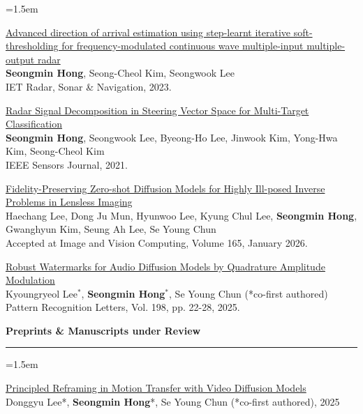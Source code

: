 \documentclass[a4paper,11pt]{article}
\newcommand{\sectitle}[1]{
    \vspace{2ex}
    {\Large\textbf{#1}}
    \vspace{0.5ex}
    \hrule
    \vspace{1.5ex}
}
\newenvironment{cvcontent}{
    \begin{list}{}{
        \leftmargin=1.5em %
        \labelwidth=0pt
        \labelsep=0pt
    }\item[]
}{
    \end{list}
}
\begin{document}
\begin{cvcontent}
\href{https://ietresearch.onlinelibrary.wiley.com/doi/10.1049/rsn2.12319}{Advanced direction of arrival estimation using step-learnt iterative soft-thresholding for frequency-modulated continuous wave multiple-input multiple-output radar}\\
\textbf{Seongmin Hong}, Seong-Cheol Kim, Seongwook Lee\\
IET Radar, Sonar \& Navigation, 2023.

\href{https://ieeexplore.ieee.org/abstract/document/9552897}{Radar Signal Decomposition in Steering Vector Space for Multi-Target Classification}\\
\textbf{Seongmin Hong}, Seongwook Lee, Byeong-Ho Lee, Jinwook Kim, Yong-Hwa Kim, Seong-Cheol Kim\\
IEEE Sensors Journal, 2021.

\href{https://doi.org/10.1016/j.imavis.2025.105786}{Fidelity-Preserving Zero-shot Diffusion Models for Highly Ill-posed Inverse Problems in Lensless Imaging}\\
Haechang Lee, Dong Ju Mun, Hyunwoo Lee, Kyung Chul Lee, \textbf{Seongmin Hong}, Gwanghyun Kim, Seung Ah Lee, Se
Young Chun\\
Accepted at Image and Vision Computing, Volume 165, January 2026.

\href{https://www.sciencedirect.com/science/authShare/S0167865525003083/20250924T034000Z/1?md5=581f3b65efe5edd888ea960eea18a821&dgcid=coauthor}{Robust Watermarks for Audio Diffusion Models by Quadrature Amplitude Modulation}\\
Kyoungryeol Lee$^*$, \textbf{Seongmin Hong}$^*$, Se Young Chun (*co-first authored)\\
Pattern Recognition Letters, Vol. 198, pp. 22-28, 2025.

\end{cvcontent}
\sectitle{Preprints \& Manuscripts under Review}
\begin{cvcontent}
    \href{https://dx.doi.org/10.2139/ssrn.5397023}{Principled Reframing in Motion Transfer with Video Diffusion Models} \\
    Donggyu Lee*, \textbf{Seongmin Hong}*, Se Young Chun (*co-first authored), 2025 \\
\end{cvcontent}
\end{document}
